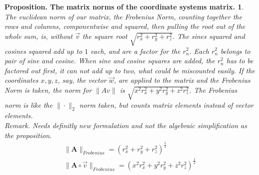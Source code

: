 \documentclass[a4paper]{article}
\begin{document}
\newtheorem{PropositionMatrixNorm}{Proposition. The matrix norms of the coordinate systems matrix.}
\begin{PropositionMatrixNorm}
\label{proposition_matrix_norm}
The euclidean norm of our matrix, the Frobenius Norm, counting together the rows and columns, componentwise and squared, then pulling the root out of the whole sum, is, without $\vec{v}$ the square root $\sqrt{r_{x}^{2}+r_{y}^{2}+r_{z}^{2}}$. The sines squared and cosines squared add up to $1$ each, and are a factor for the $r_{n}^{2}$. Each $r_{n}^{2}$ belongs to pair of sine and cosine. When sine and cosine squares are added, the $r_{n}^{2}$ has to be factored out first, it can not add up to two, what could be miscounted easily. If the coordinates $x,y,z$, say, the vector $\vec{w}$, are applied to the matrix and the Frobenius Norm is taken, the norm for $\|Av\|$ is $\sqrt{x^{2}r_{x}^{2}+y^{2}r_{y}^{2}+z^{2}r_{z}^{2}}$. The Frobenius norm is like the $\|\cdot\|_{2}$ norm taken, but counts matrix elements instead of vector elements.\\

Remark. Needs definitly new formulation and not the algebraic simplification as the proposition.\\

\begin{displaymath}
\begin{align}
\|\boldsymbol{A}\|_{Frobenius} = (r_{x}^{2}+r_{y}^{2}+r_{z}^{2})^{\frac{1}{2}}\\
\|\boldsymbol{A}\circ\vec{v}\|_{Frobenius} = (x^{2}r_{x}^{2}+y^{2}r_{y}^{2}+z^{2}r_{z}^{2})^{\frac{1}{2}}
\end{align}
\end{displaymath}
\end{PropositionMatrixNorm}
\end{document}
